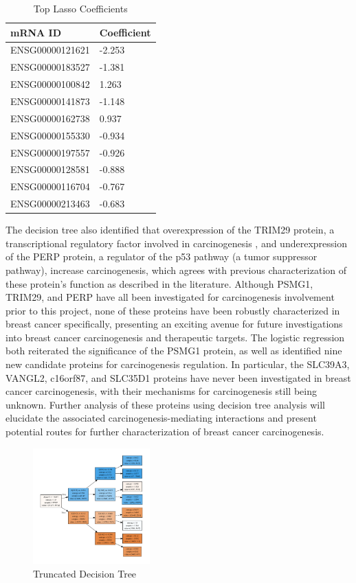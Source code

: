 \documentclass[10.5pt, oneside, twocolumn]{article}   	%
\begin{document}
\begin{table}[h]
\centering
\caption{Top Lasso Coefficients}
\begin{tabular}{@{}ll@{}}
\toprule
mRNA ID            & Coefficient         \\ \midrule
ENSG00000121621 & -2.253  \\
ENSG00000183527 & -1.381 \\
ENSG00000100842 & 1.263  \\
ENSG00000141873 & -1.148 \\
ENSG00000162738 & 0.937   \\
ENSG00000155330 & -0.934 \\
ENSG00000197557 & -0.926 \\
ENSG00000128581 & -0.888 \\
ENSG00000116704 & -0.767 \\
ENSG00000213463 & -0.683 \\ \bottomrule
\end{tabular}
\end{table}

The decision tree also identified that overexpression of the TRIM29 protein, a transcriptional regulatory factor involved in carcinogenesis \cite{sho2011trim29}, and underexpression of the PERP protein, a regulator of the p53 pathway (a tumor suppressor pathway)\cite{attardi2000perp}, increase carcinogenesis, which agrees with previous characterization of these protein’s function as described in the literature. Although PSMG1, TRIM29, and PERP have all been investigated for carcinogenesis involvement prior to this project, none of these proteins have been robustly characterized in breast cancer specifically, presenting an exciting avenue for future investigations into breast cancer carcinogenesis and therapeutic targets. The logistic regression both reiterated the significance of the PSMG1 protein, as well as identified nine new candidate proteins for carcinogenesis regulation. In particular, the SLC39A3\cite{kelleher2009zip3}, VANGL2\cite{andre2012wnt}, c16orf87\cite{tan2013functional}, and SLC35D1\cite{hiraoka2007nucleotide} proteins have never been investigated in breast cancer carcinogenesis, with their mechanisms for carcinogenesis still being unknown. Further analysis of these proteins using decision tree analysis will elucidate the associated carcinogenesis-mediating interactions and present potential routes for further characterization of breast cancer carcinogenesis. 

\begin{figure}[!hb]
	\caption{Truncated Decision Tree}
	\centering
	\includegraphics[width=0.4\textwidth]{graph_3.pdf}
\end{figure}
\end{document}
